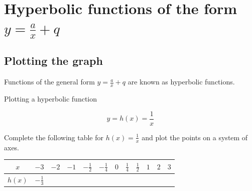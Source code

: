 \section{Hyperbolic functions of the form $y=\frac{a}{x}+q$}


\subsection*{Plotting the graph}  
Functions of the general form $y=\frac{a}{x}+q$ are known as hyperbolic functions. 

\begin{wex}
{Plotting a hyperbolic function}
{
\begin{equation*}
 y = h(x) = \frac{1}{x}
\end{equation*}

Complete the following table for $h(x) = \frac{1}{x}$ and plot the points on a system of axes.

\begin{table}[H]
\begin{center}
\begin{tabular}{|c|c|c|c|c|c|c|c|c|c|c|c|}
\hline
  $x$ &  $-3$ & $-2$ & $-1$ & $-\frac{1}{2}$ & $-\frac{1}{4}$ &$0$&$\frac{1}{4}$&$\frac{1}{2}$&$1$&$2$&$3$
\\ \hline
 $h(x)$& $-\frac{1}{3}$ &&&&&&&&&&
\\ \hline
\end{tabular}
\end{center}
\end{table}


}
\end{wex}
